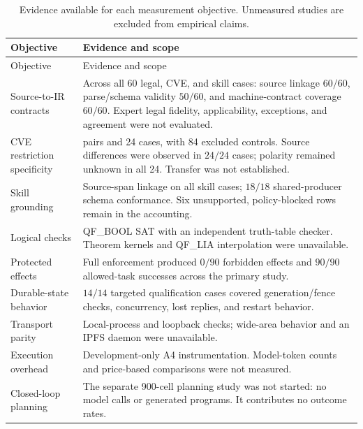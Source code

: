 \begin{longtable}{@{}>{\raggedright\arraybackslash}p{.26\linewidth} >{\raggedright\arraybackslash}p{.68\linewidth}@{}}
\caption{Evidence available for each measurement objective. Unmeasured studies are excluded from empirical claims.}\label{tab:E1}\\
\toprule
Objective & Evidence and scope \\
\midrule
\endfirsthead
\toprule
Objective & Evidence and scope \\
\midrule
\endhead
\bottomrule
\endlastfoot
Source-to-IR contracts & Across all 60 legal, CVE, and skill cases: source linkage $60/60$, parse/schema validity $50/60$, and machine-contract coverage $60/60$. Expert legal fidelity, applicability, exceptions, and agreement were not evaluated. \\[4pt]
CVE restriction specificity & 12 pairs and 24 cases, with 84 excluded controls. Source differences were observed in $24/24$ cases; polarity remained unknown in all 24. Transfer was not established. \\[4pt]
Skill grounding & Source-span linkage on all skill cases; $18/18$ shared-producer schema conformance. Six unsupported, policy-blocked rows remain in the accounting. \\[4pt]
Logical checks & QF\_BOOL SAT with an independent truth-table checker. Theorem kernels and QF\_LIA interpolation were unavailable. \\[4pt]
Protected effects & Full enforcement produced $0/90$ forbidden effects and $90/90$ allowed-task successes across the primary study. \\[4pt]
Durable-state behavior & $14/14$ targeted qualification cases covered generation/fence checks, concurrency, lost replies, and restart behavior. \\[4pt]
Transport parity & Local-process and loopback checks; wide-area behavior and an IPFS daemon were unavailable. \\[4pt]
Execution overhead & Development-only A4 instrumentation. Model-token counts and price-based comparisons were not measured. \\[4pt]
Closed-loop planning & The separate 900-cell planning study was not started: no model calls or generated programs. It contributes no outcome rates. \\
\end{longtable}
